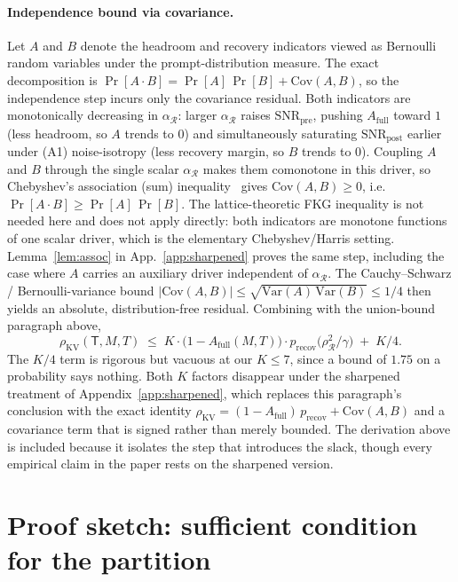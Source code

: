\paragraph{Independence bound via covariance.} Let $A$ and $B$ denote the
headroom and recovery indicators viewed as Bernoulli random variables under
the prompt-distribution measure. The exact decomposition is
$\Pr[A \cdot B] = \Pr[A]\,\Pr[B] + \mathrm{Cov}(A, B)$, so the independence
step incurs only the covariance residual. Both indicators are monotonically
decreasing in $\alpha_{\mathcal{R}}$: larger $\alpha_{\mathcal{R}}$ raises
$\mathrm{SNR}_{\mathrm{pre}}$, pushing $A_{\mathrm{full}}$ toward $1$ (less
headroom, so $A$ trends to $0$) and simultaneously saturating
$\mathrm{SNR}_{\mathrm{post}}$ earlier under (A1) noise-isotropy (less
recovery margin, so $B$ trends to $0$). Coupling $A$ and $B$ through the
single scalar $\alpha_{\mathcal{R}}$ makes them comonotone in this driver, so
Chebyshev's association (sum) inequality~\citep{Harris_1960} gives
$\mathrm{Cov}(A, B) \ge 0$, i.e.\ $\Pr[A \cdot B] \ge \Pr[A]\,\Pr[B]$. The
lattice-theoretic FKG inequality is not needed here and does not apply
directly: both indicators are monotone functions of one scalar driver, which
is the elementary Chebyshev/Harris setting. Lemma~\ref{lem:assoc} in
App.~\ref{app:sharpened} proves the same step, including the case where $A$
carries an auxiliary driver independent of $\alpha_{\mathcal{R}}$. The Cauchy--Schwarz / Bernoulli-variance
bound $|\mathrm{Cov}(A, B)| \le \sqrt{\mathrm{Var}(A)\,\mathrm{Var}(B)} \le 1/4$
then yields an absolute, distribution-free residual. Combining with the
union-bound paragraph above,
\[
\rho_{\mathrm{KV}}(\mathsf{T}, M, T)
\;\le\; K \cdot \bigl(1 - A_{\mathrm{full}}(M, T)\bigr)
\cdot p_{\mathrm{recov}}\bigl(\rho_{\mathcal{R}}^2 / \gamma\bigr)
\;+\; K/4.
\]
The $K/4$ term is rigorous but vacuous at our $K \le 7$, since a bound of
$1.75$ on a probability says nothing. Both $K$ factors disappear under the
sharpened treatment of Appendix~\ref{app:sharpened}, which replaces this
paragraph's conclusion with the exact identity
$\rho_{\mathrm{KV}} = (1 - A_{\mathrm{full}})\,p_{\mathrm{recov}}
+ \mathrm{Cov}(A, B)$ and a covariance term that is signed rather than
merely bounded. The derivation above is included because it isolates the step
that introduces the slack, though every empirical claim in the paper rests on the
sharpened version.

\section{Proof sketch: sufficient condition for the partition}
\label{app:sufficient}

